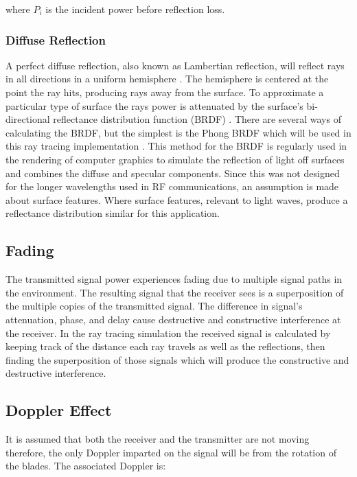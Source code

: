 where $P_i$ is the incident power before reflection loss.

\subsubsection{Diffuse Reflection}
A perfect diffuse reflection, also known as Lambertian reflection, will reflect rays in all directions in a uniform hemisphere \cite{Sizun2005}. The hemisphere is centered at the point the ray hits, producing rays away from the surface. To approximate a particular type of surface the rays power is attenuated by the surface's bi-directional reflectance distribution function (BRDF) \cite{Suffern2007, Pharr2010, Glassner1995}. There are several ways of calculating the BRDF, but the simplest is the Phong BRDF which will be used in this ray tracing implementation \cite{Phong:1998:ICG:280811.280980}. This method for the BRDF is regularly used in the rendering of computer graphics to simulate the reflection of light off surfaces and combines the diffuse and specular components. Since this was not designed for the longer wavelengths used in RF communications, an assumption is made about surface features. Where surface features, relevant to light waves,  produce a reflectance distribution similar for this application. 


\subsection{Fading}

The transmitted signal power experiences fading due to multiple signal paths in the environment. The resulting signal that the receiver sees is a superposition of the multiple copies of the transmitted signal. The difference in signal's attenuation, phase, and delay cause destructive and constructive interference at the receiver. In the ray tracing simulation the received signal is calculated by keeping track of the distance each ray travels as well as the reflections, then finding the superposition of those signals which will produce the constructive and destructive interference.

\subsection{Doppler Effect}
It is assumed that both the receiver and the transmitter are not moving therefore, the only Doppler imparted on the signal will be from the rotation of the blades. The associated Doppler is:

